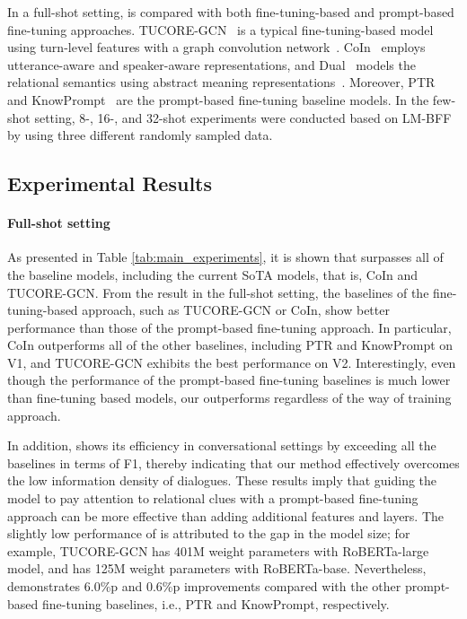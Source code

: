 \documentclass[11pt]{article}
\begin{document}
In a full-shot setting,  is compared with both fine-tuning-based and prompt-based fine-tuning approaches.
TUCORE-GCN~\citep{lee-choi-2021-graph} is a typical fine-tuning-based model using turn-level features with a graph convolution network~\citep{kipf2016semi}. CoIn~\citep{ijcai2021-535} employs utterance-aware and speaker-aware representations, 
and Dual~\citep{bai-etal-2021-semantic} models the relational semantics using abstract meaning representations~\citep{banarescu-etal-2013-abstract}. Moreover, PTR~\citep{han2021ptr} and KnowPrompt~\citep{chen2021knowprompt} are the prompt-based fine-tuning baseline models. In the few-shot setting, 8-, 16-, and 32-shot experiments were conducted based on LM-BFF~\citep{gao2020making} by using three different randomly sampled data. 

\subsection{Experimental Results}
\paragraph{Full-shot setting}

As presented in Table \ref{tab:main_experiments}, it is shown that  surpasses all of the baseline models, including the current SoTA models, that is, CoIn and TUCORE-GCN. From the result in the full-shot setting, the baselines of the fine-tuning-based approach, such as TUCORE-GCN or CoIn, show better performance than those of the prompt-based fine-tuning approach. In particular, CoIn outperforms all of the other baselines, including PTR and KnowPrompt on V1, and TUCORE-GCN exhibits the best performance on V2. Interestingly, even though the performance of the prompt-based fine-tuning baselines is much lower than fine-tuning based models, our  outperforms regardless of the way of training approach. 

In addition,  shows its efficiency in conversational settings by exceeding all the baselines in terms of F1, thereby indicating that our method effectively overcomes the low information density of dialogues. These results imply that guiding the model to pay attention to relational clues with a prompt-based fine-tuning approach can be more effective than adding additional features and layers. 
The slightly low performance of  is attributed to the gap in the model size; for example, TUCORE-GCN has 401M weight parameters with RoBERTa-large model, and  has 125M weight parameters with RoBERTa-base.   Nevertheless,  demonstrates 6.0\%p and 0.6\%p improvements compared with the other prompt-based fine-tuning baselines, i.e., PTR and KnowPrompt, respectively. 
\end{document}
